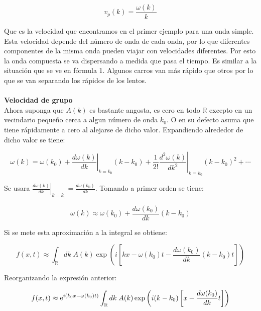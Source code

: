 \documentclass[12pt]{article}
\newcommand{\e}{{\rm e}}
\begin{document}
\begin{equation}
v_p(k) = \frac{\omega(k)}{k}
\end{equation}

Que es la velocidad que encontramos en el primer ejemplo para una onda simple. Esta velocidad depende del número de onda de cada onda, por lo que diferentes componentes de la misma onda pueden viajar con velocidades diferentes. Por esto la onda compuesta se va dispersando a medida que pasa el tiempo. Es similar a la situación que se ve en fórmula 1. Algunos carros van más rápido que otros por lo que se van separando los rápidos de los lentos.\\
\\

\textbf{Velocidad de grupo}\\

Ahora suponga que $A(k)$ es bastante angosta, es cero en todo $\mathbb{R}$ excepto en un vecindario pequeño cerca a algun número de onda $k_0$. O en su defecto asuma que tiene rápidamente a cero al alejarse de dicho valor. Expandiendo alrededor de dicho valor se tiene:

\begin{equation}
\omega(k) = \omega(k_0) + \left.\frac{d \omega(k)}{dk}\right|_{k=k_0} (k-k_0) + \frac{1}{2!}\left.\frac{d^2 \omega(k)}{dk^2}\right|_{k=k_0} (k-k_0)^2+\cdots
\end{equation}

Se usara  $\left.\frac{d \omega(k)}{dk}\right|_{k=k_0} =\frac{d \omega(k_0)}{dk}$. Tomando a primer orden se tiene:

\begin{equation}
\omega(k) \approx \omega(k_0) + \frac{d \omega(k_0)}{dk} (k-k_0) 
\end{equation}

Si se mete esta aproximación a la integral se obtiene:


\begin{equation}
f(x,t) \approx \int_{\mathbb{R}} dk\; A(k)  \exp\left(i \left[kx -   \omega(k_0)t -\frac{d \omega(k_0)}{dk}(k-k_0)t   \right]      \right)
\end{equation}
 
 Reorganizando la expresión anterior:
 
 \begin{equation}
 f(x,t) \approx \e^{i(k_0x-\omega(k_0)t)} \int_{\mathbb{R}} dk\; A(k)  \exp\left(i(k-k_0) \left[x - \frac{d \omega(k_0)}{dk} t   \right]      \right)
 \end{equation}
 
\end{document}
